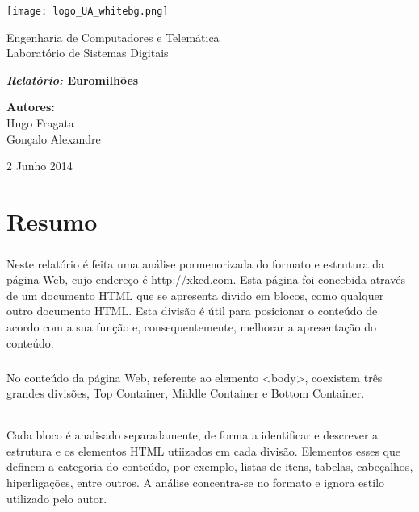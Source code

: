 \documentclass[a4paper,12pt,openright,oneside]{report}
\begin{document}
\begin{titlepage}
\begin{center}
\texttt{[image: logo\_UA\_whitebg.png]}~\\[1cm]
\begin{large}
Engenharia de Computadores e Telemática\\[0.5cm]
Laboratório de Sistemas Digitais
\end{large}

\vspace{4cm}
\begin{LARGE}
{\Huge \textbf{\textit{Relatório:} Euromilhões}}
\end{LARGE}
\vspace{5.5cm}

\begin{minipage}{0.4\textwidth}
\begin{flushleft} \large
\begin{large}
\textbf{Autores:}\\
Hugo Fragata\\
Gonçalo Alexandre\\[0.2cm]
\end{large}
\begin{footnotesize}
\textbf{}
\end{footnotesize}
\end{flushleft}
\end{minipage}

\vfill
{\normalsize  2 Junho 2014}
\end{center}
\end{titlepage}

 \chapter*{Resumo}
 \paragraph*{}
Neste relatório é feita uma análise pormenorizada do formato e estrutura da página Web, cujo endereço é http://xkcd.com. Esta página foi concebida através de um documento HTML que se apresenta divido em blocos, como qualquer outro documento HTML. Esta divisão é útil para posicionar o conteúdo de acordo com a sua função e, consequentemente, melhorar a apresentação do conteúdo.
\paragraph*{}
No conteúdo da página Web, referente ao elemento <body>, coexistem três grandes divisões, Top Container, Middle Container e Bottom Container.
\subparagraph*{}
Cada bloco é analisado separadamente, de forma a identificar e descrever a estrutura e os elementos HTML utiizados em cada divisão. Elementos esses que definem a categoria do conteúdo, por exemplo, listas de itens, tabelas, cabeçalhos, hiperligações, entre outros. A análise concentra-se no formato e ignora  estilo utilizado pelo autor.  
\end{document}
